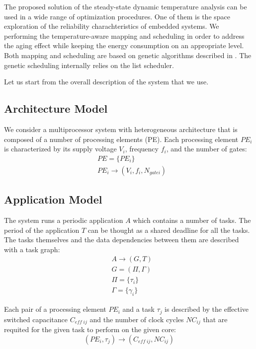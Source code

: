 The proposed solution of the steady-state dynamic temperature analysis can be used in a wide range of optimization procedures. One of them is the space exploration of the reliability charachteristics of embedded systems. We performing the temperature-aware mapping and scheduling in order to address the aging effect while keeping the energy consumption on an appropriate level. Both mapping and scheduling are based on genetic algorithms described in \cite{schmitz2004}. The genetic scheduling internally relies on the list scheduler.

Let us start from the overall description of the system that we use.

\subsection{Architecture Model}
We consider a multiprocessor system with heterogeneous architecture that is composed of a number of processing elements (PE). Each processing element $PE_i$ is characterized by its supply voltage $V_i$, frequency $f_i$, and the number of gates:
\begin{align*}
  & PE = \{ PE_i \} \\
  & PE_i \rightarrow (V_i, f_i, N_{gate i})
\end{align*}

\subsection{Application Model}
The system runs a periodic application $A$ which contains a number of tasks. The period of the application $T$ can be thought as a shared deadline for all the tasks. The tasks themselves and the data dependencies between them are described with a task graph:
\begin{align*}
  & A \rightarrow (G, T) \\
  & G = (\Pi, \Gamma) \\
  & \Pi = \{\tau_i\} \\
  & \Gamma = \{\gamma_i\}
\end{align*}

Each pair of a processing element $PE_i$ and a task $\tau_j$ is described by the effective switched capacitance $C_{eff \; ij}$ and the number of clock cycles $NC_{ij}$ that are requited for the given task to perform on the given core:
\begin{equation*}
  (PE_i, \tau_j) \rightarrow (C_{eff \; ij}, NC_{ij})
\end{equation*}

